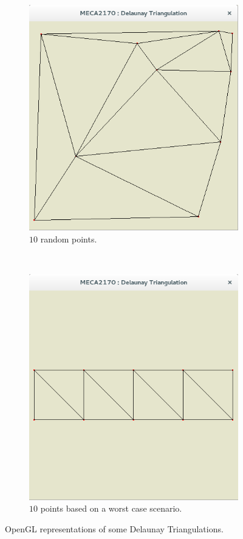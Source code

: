 \begin{figure}
\centering
\begin{subfigure}[b]{0.4\textwidth}
\includegraphics[width=\textwidth]{images/RandomCase.png}
\caption{$10$ random points.}
\label{fig:RandomCase}
\end{subfigure}
~
\begin{subfigure}[b]{0.4\textwidth}
\includegraphics[scale=0.4]{images/worstCase.png}
\caption{$10$ points based on a worst case scenario.}
\label{fig:LimitCase}
\end{subfigure}
\caption{OpenGL representations of some Delaunay Triangulations.}
\end{figure}


